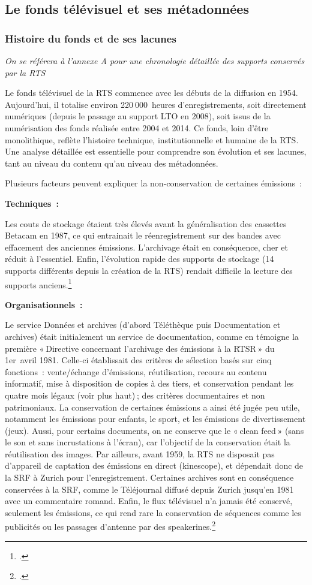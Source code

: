 \subsection{Le fonds télévisuel et ses métadonnées}

\subsubsection{Histoire du fonds et de ses lacunes}
\textit{On se référera à l'annexe A pour une chronologie détaillée des supports conservés par la RTS}

Le fonds télévisuel de la RTS commence avec les débuts de la diffusion en 1954. Aujourd’hui, il totalise environ 220 000 heures d’enregistrements, soit directement numériques (depuis le passage au support LTO en 2008), soit issus de la numérisation des fonds réalisée entre 2004 et 2014. Ce fonds, loin d’être monolithique, reflète l’histoire technique, institutionnelle et humaine de la RTS. Une analyse détaillée est essentielle pour comprendre son évolution et ses lacunes, tant au niveau du contenu qu’au niveau des métadonnées.

Plusieurs facteurs peuvent expliquer la non-conservation de certaines émissions :

\textbf{Techniques :}

Les couts de stockage étaient très élevés avant la généralisation des cassettes Betacam en 1987, ce qui entrainait le réenregistrement sur des bandes avec effacement des anciennes émissions. L’archivage était en conséquence, cher et réduit à l’essentiel. Enfin, l’évolution rapide des supports de stockage (14 supports différents depuis la création de la RTS) rendait difficile la lecture des supports anciens.\footcite{barcella2024a}

\textbf{Organisationnels :}

Le service Données et archives (d’abord Téléthèque puis Documentation et archives) était initialement un service de documentation, comme en témoigne la première « Directive concernant l’archivage des émissions à la RTSR » du 1er avril 1981. Celle-ci établissait des critères de sélection basés sur cinq fonctions : vente/échange d’émissions, réutilisation, recours au contenu informatif, mise à disposition de copies à des tiers, et conservation pendant les quatre mois légaux (voir plus haut) ; des critères documentaires et non patrimoniaux. La conservation de certaines émissions a ainsi été jugée peu utile, notamment les émissions pour enfants, le sport, et les émissions de divertissement (jeux). Aussi, pour certains documents, on ne conserve que le « clean feed » (sans le son et sans incrustations à l’écran), car l’objectif de la conservation était la réutilisation des images.
Par ailleurs, avant 1959, la RTS ne disposait pas d’appareil de captation des émissions en direct (kinescope), et dépendait donc de la SRF à Zurich pour l’enregistrement. Certaines archives sont en conséquence conservées à la SRF, comme le Téléjournal diffusé depuis Zurich jusqu’en 1981 avec un commentaire romand. Enfin, le flux télévisuel n’a jamais été conservé, seulement les émissions, ce qui rend rare la conservation de séquences comme les publicités ou les passages d’antenne par des speakerines.\footcite{barcella2024a}

